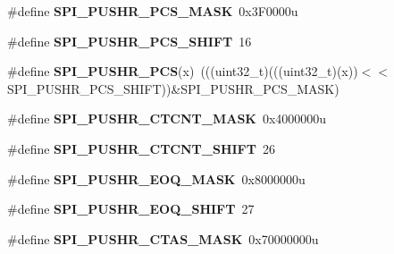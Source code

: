 \begin{DoxyCompactItemize}
\item 
\#define {\bfseries S\+P\+I\+\_\+\+P\+U\+S\+H\+R\+\_\+\+P\+C\+S\+\_\+\+M\+A\+SK}~0x3\+F0000u\hypertarget{group__SPI__Register__Masks_gae2a7d0ea8a143281112074fe3745a70c}{}\label{group__SPI__Register__Masks_gae2a7d0ea8a143281112074fe3745a70c}

\item 
\#define {\bfseries S\+P\+I\+\_\+\+P\+U\+S\+H\+R\+\_\+\+P\+C\+S\+\_\+\+S\+H\+I\+FT}~16\hypertarget{group__SPI__Register__Masks_gafb0dfe436cd6273ce0b0052aca58499e}{}\label{group__SPI__Register__Masks_gafb0dfe436cd6273ce0b0052aca58499e}

\item 
\#define {\bfseries S\+P\+I\+\_\+\+P\+U\+S\+H\+R\+\_\+\+P\+CS}(x)~(((uint32\+\_\+t)(((uint32\+\_\+t)(x))$<$$<$S\+P\+I\+\_\+\+P\+U\+S\+H\+R\+\_\+\+P\+C\+S\+\_\+\+S\+H\+I\+FT))\&S\+P\+I\+\_\+\+P\+U\+S\+H\+R\+\_\+\+P\+C\+S\+\_\+\+M\+A\+SK)\hypertarget{group__SPI__Register__Masks_gad551a287ffb207f5d78c2ac04d393a9b}{}\label{group__SPI__Register__Masks_gad551a287ffb207f5d78c2ac04d393a9b}

\item 
\#define {\bfseries S\+P\+I\+\_\+\+P\+U\+S\+H\+R\+\_\+\+C\+T\+C\+N\+T\+\_\+\+M\+A\+SK}~0x4000000u\hypertarget{group__SPI__Register__Masks_gad9e8859d590a59f5e208f5f4a2c8b873}{}\label{group__SPI__Register__Masks_gad9e8859d590a59f5e208f5f4a2c8b873}

\item 
\#define {\bfseries S\+P\+I\+\_\+\+P\+U\+S\+H\+R\+\_\+\+C\+T\+C\+N\+T\+\_\+\+S\+H\+I\+FT}~26\hypertarget{group__SPI__Register__Masks_ga7db8f0d7ae83f27f34eafd5e4d993ed1}{}\label{group__SPI__Register__Masks_ga7db8f0d7ae83f27f34eafd5e4d993ed1}

\item 
\#define {\bfseries S\+P\+I\+\_\+\+P\+U\+S\+H\+R\+\_\+\+E\+O\+Q\+\_\+\+M\+A\+SK}~0x8000000u\hypertarget{group__SPI__Register__Masks_ga997edfebb20bfe6a385f018eb9a8a8fb}{}\label{group__SPI__Register__Masks_ga997edfebb20bfe6a385f018eb9a8a8fb}

\item 
\#define {\bfseries S\+P\+I\+\_\+\+P\+U\+S\+H\+R\+\_\+\+E\+O\+Q\+\_\+\+S\+H\+I\+FT}~27\hypertarget{group__SPI__Register__Masks_ga81e193cbd4602af43cd59a35e56fa958}{}\label{group__SPI__Register__Masks_ga81e193cbd4602af43cd59a35e56fa958}

\item 
\#define {\bfseries S\+P\+I\+\_\+\+P\+U\+S\+H\+R\+\_\+\+C\+T\+A\+S\+\_\+\+M\+A\+SK}~0x70000000u\hypertarget{group__SPI__Register__Masks_ga3ac8018fdfe57c16da2782e99232ae45}{}\label{group__SPI__Register__Masks_ga3ac8018fdfe57c16da2782e99232ae45}


\end{DoxyCompactItemize}
